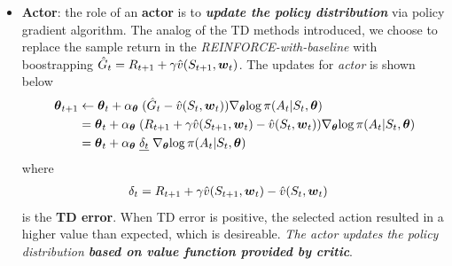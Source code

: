 \documentclass[11pt]{article}
\begin{document}
\begin{itemize}
\item \textbf{Actor}: the role of an \textbf{actor} is to \textbf{\emph{update the policy distribution}} via policy gradient algorithm. The analog of the TD methods introduced, we choose to replace the sample return in the \emph{REINFORCE-with-baseline} with  boostrapping $\hat{G}_{t} = R_{t+1} + \gamma\hat{v}(S_{t+1}, \boldsymbol{w}_t )$. The updates for \emph{actor} is shown below
\begin{align}
\boldsymbol{\theta}_{t+1} &\leftarrow \boldsymbol{\theta}_{t} + \alpha_{\boldsymbol{\theta}} \;(\hat{G}_{t}-\hat{v}(S_{t}, \boldsymbol{w}_t ))\nabla_{\boldsymbol{\theta}}{\log\pi(A_{t}|S_{t}, \boldsymbol{\theta})} \nonumber\\
&= \boldsymbol{\theta}_{t} +  \alpha_{\boldsymbol{\theta}} \;(R_{t+1} + \gamma\hat{v}(S_{t+1}, \boldsymbol{w}_t ) -  \hat{v}(S_{t}, \boldsymbol{w}_t ))\nabla_{\boldsymbol{\theta}}{\log\pi(A_{t}|S_{t}, \boldsymbol{\theta})}  \nonumber\\
&= \boldsymbol{\theta}_{t} + \alpha_{\boldsymbol{\theta}}  \;\underline{\delta_t}\; \nabla_{\boldsymbol{\theta}}{\log\pi(A_{t}|S_{t}, \boldsymbol{\theta})} \label{eqn: actor_update}
\end{align} where 
\begin{align*}
\delta_{t}&= R_{t+1} + \gamma \hat{v}(S_{t+1}, \boldsymbol{w}_{t}) - \hat{v}(S_{t}, \boldsymbol{w}_{t})
\end{align*}
 is the \textbf{TD error}. When TD error is positive, the selected action resulted in a higher value than expected, which is desireable. \emph{ The actor updates the policy distribution \textbf{based on  value function provided by critic}}.


\end{itemize}
\end{document}

